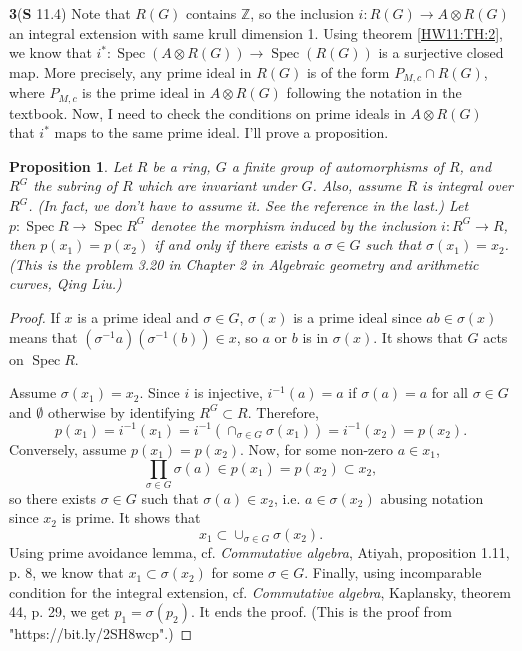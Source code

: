 \documentclass[a4paper, 12pt]{article}
\theoremstyle{Mydefinition}
\theoremstyle{Mytheorem}
\newtheorem{proposition}[statement]{Proposition}
\DeclareMathOperator{\Spec}{Spec}
\begin{document}
\noindent \textbf{3}(\textbf{S} 11.4)
Note that $R(G)$ contains $\mathbb{Z}$, so the inclusion $i:R(G)\rightarrow A\otimes R(G)$ an integral extension with same krull dimension 1. Using theorem \ref{HW11:TH:2}, we know that $i^*:\Spec(A\otimes R(G))\rightarrow \Spec(R(G))$ is a surjective closed map. More precisely, any prime ideal in $R(G)$ is of the form $P_{M, c}\cap R(G)$, where $P_{M,c}$ is the prime ideal in $A\otimes R(G)$ following the notation in the textbook. Now, I need to check the conditions on prime ideals in $A\otimes R(G)$ that $i^*$ maps to the same prime ideal. I'll prove a proposition.
\begin{proposition}
Let $R$ be a ring, $G$ a finite group of automorphisms of $R$, and $R^G$ the subring of $R$ which are invariant under $G$. Also, assume $R$ is integral over $R^G$. (In fact, we don't have to assume it. See the reference in the last.) Let $p:\Spec R\rightarrow \Spec R^G$ denotee the morphism induced by the inclusion $i:R^G\rightarrow R$, then $p(x_1)=p(x_2)$ if and only if there exists a $\sigma\in G$ such that $\sigma(x_1)=x_2$.(This is the problem 3.20 in Chapter 2 in \textit{Algebraic geometry and arithmetic curves}, Qing Liu.)
\end{proposition}
\begin{proof}
If $x$ is a prime ideal and $\sigma\in G$, $\sigma(x)$ is a prime ideal since $ab\in \sigma(x)$ means that $(\sigma^{-1}a)(\sigma^{-1}(b))\in x$, so $a$ or $b$ is in $\sigma(x)$. It shows that $G$ acts on $\Spec R$.

Assume $\sigma(x_1)=x_2$. Since $i$ is injective, $i^{-1}(a)=a$ if $\sigma(a)=a$ for all $\sigma \in G$ and $\emptyset$ otherwise by identifying $R^G\subset R$. Therefore,
\begin{equation}
    p(x_1) = i^{-1}(x_1) = i^{-1}\left(\cap_{\sigma \in G}\sigma(x_1)\right) = i^{-1}(x_2) = p(x_2).
\end{equation}
Conversely, assume $p(x_1)=p(x_2)$. Now, for some non-zero $a \in x_1$, 
\begin{equation}
    \prod_{\sigma\in G}\sigma(a)\in p(x_1)=p(x_2)\subset x_2,
\end{equation}
so there exists $\sigma\in G$ such that $\sigma(a)\in x_2$, i.e. $a\in \sigma(x_2)$ abusing notation since $x_2$ is prime. It shows that
\begin{equation}
    x_1\subset \cup_{\sigma\in G}\sigma(x_2).
\end{equation}
Using prime avoidance lemma, cf. \textit{Commutative algebra}, Atiyah, proposition 1.11, p. 8, we know that $x_1\subset \sigma(x_2)$ for some $\sigma\in G$. Finally, using incomparable condition for the integral extension, cf. \textit{Commutative algebra}, Kaplansky, theorem 44, p. 29, we get $p_1=\sigma(p_2)$. It ends the proof.
(This is the proof from "https://bit.ly/2SH8wcp".)
\end{proof}
\end{document}
